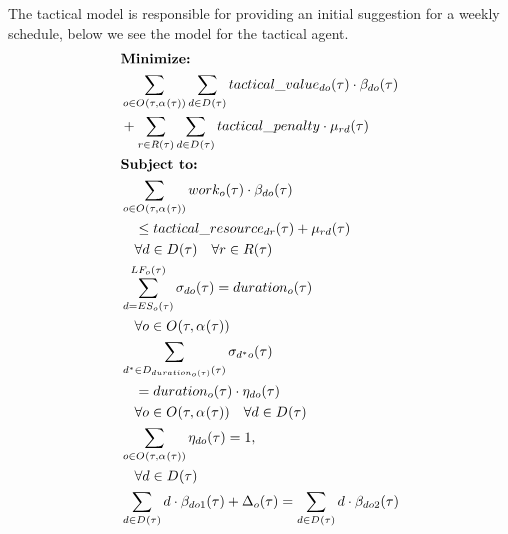 The tactical model is responsible for providing an initial suggestion for a weekly schedule, below we see the model for the tactical agent.
\begin{alignat}{2}
	& \textbf{Minimize:} \notag\\
	& \sum_{\ElementOperation \in \SetOperation{}{\VarStrategicWorkOrderAssignment{}{}}} \sum_{\ElementDays \in \SetDays{}} \ParTacticalValue \cdot \VarTacticalWork{\ElementDays}{\ElementOperation}\notag\\  
	& + \sum_{r \in \SetResource} \sum_{\ElementDays \in \SetDays{}} \ParTacticalPenalty \cdot \VarTacticalExcess                                               \\  
	& \textbf{Subject to:}                                                          \notag                                                                   \\
	& \sum_{\ElementOperation \in \SetOperation{}{\VarStrategicWorkOrderAssignment{}{}}} \ParOperationWork{\ElementOperation} \cdot \VarTacticalWork{\ElementDays}{\ElementOperation}\notag\\
	& \quad \leq \ParTacticalResource + \VarTacticalExcess\notag\\ 
	& \quad \forall \ElementDays \in \SetDays{} \quad \forall r \in \SetResource\\ 
	& \sum_{\ElementDays = \ParEarliestStart}^{\ParLatestFinish} \VarTacticalWorkBinary{\ElementDays}{\ElementOperation} = \ParDuration \notag\\
	& \quad \forall \ElementOperation \in \SetOperation{}{\VarStrategicWorkOrderAssignment{}{}} \\
	& \sum_{\ElementDays^* \in  \SetDays{\ParDuration}} \VarTacticalWorkBinary{\ElementDays^*}{\ElementOperation} \notag\\
	& \quad = \ParDuration \cdot \VarTacticalWorkBinaryConsecutive \notag\\ 
	& \quad \forall \ElementOperation \in \SetOperation{}{\VarStrategicWorkOrderAssignment{}{}} \quad \forall \ElementDays \in \SetDays{} \\
	& \sum_{\ElementOperation \in \SetOperation{}{\VarStrategicWorkOrderAssignment{}{}}} \VarTacticalWorkBinaryConsecutive = 1, \notag\\
	& \quad \forall \ElementDays \in \SetDays{} \notag\\
	& \sum_{\ElementDays \in \SetDays{}} \ElementDays \cdot \VarTacticalWork{\ElementDays}{\ElementOperation1} + \VarTacticalOperationDifference  = \sum_{\ElementDays \in \SetDays{}} \ElementDays \cdot \VarTacticalWork{\ElementDays}{\ElementOperation2}                   \notag  \\ 

\end{alignat}
